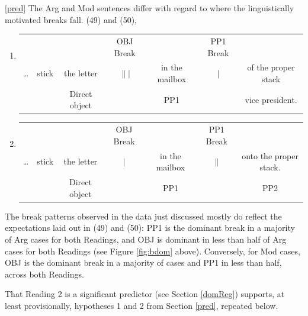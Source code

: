 \documentclass[12pt,oneside]{book}
\begin{document}
 \ref{pred} The Arg and Mod sentences differ with regard to where the linguistically motivated breaks fall.  (49) and (50), 

\singlespacing

\begin{enumerate}
\def\labelenumi{(\arabic{enumi})}
\setcounter{enumi}{48}
\item
  \begin{tabular}{ccccccc}
    & & & \small OBJ Break & & \small PP1 Break & \\
    \dots & stick & the letter & $\||$ & in the mailbox & $\vert$ & of the proper stack \\
    & & \footnotesize Direct object & & \footnotesize PP1 & & \footnotesize vice president. \\
  \end{tabular}
\item
  \begin{tabular}{ccccccc}
    & & & \small OBJ Break & & \small PP1 Break & \\
    \dots & stick & the letter & $\vert$ & in the mailbox & $\|$ & onto the proper stack. \\
    & & \footnotesize Direct object & & \footnotesize PP1 & & \footnotesize PP2 \\
  \end{tabular}
\end{enumerate}

\doublespacing

The break patterns observed in the data just discussed mostly do reflect the expectations laid out in (49) and (50): PP1 is the dominant break in a majority of Arg cases for both Readings, and OBJ is dominant in less than half of Arg cases for both Readings (see Figure \ref{fig:bdom} above). Conversely, for Mod cases, OBJ is the dominant break in a majority of cases and PP1 in less than half, across both Readings.

That Reading 2 is a significant predictor  (see Section \ref{domReg}) supports, at least provisionally, hypotheses 1 and 2 from Section \ref{pred}, repeated below.
\end{document}
